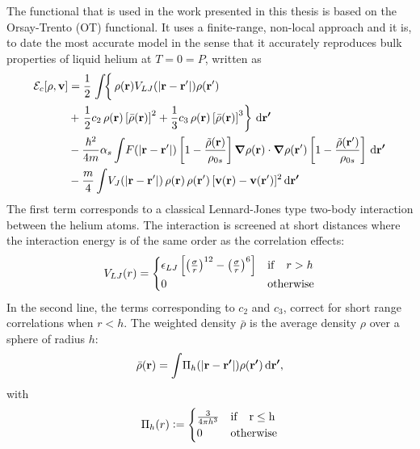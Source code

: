 		The functional that is used in the work presented in this thesis is based on the Orsay-Trento (OT) functional\citep{Dalfovo1995}. It uses a finite-range, non-local approach and it is, to date the most accurate model in the sense that it accurately reproduces bulk properties of liquid helium at $T=0=P$, written as		
		\begin{align}
			\mathcal{E}_c[\rho ,\bm{\mathrm{v}}] &=  
			\frac{1}{2} \left.\int \! \right\{\rho({\bf r}) V_{LJ}(|{\bf r}-{\bf r'}|) \rho({\bf r'}) \nonumber \\
			&+ \left.\frac{1}{2} c_2\, \rho({\bf r}) \left[{\bar \rho}({\bf r}) \right]^2 
			+ \frac{1}{3} c_3 \, \rho({\bf r}) \left[ {\bar \rho}({\bf r}) \right]^3\right\}\,\mathrm{d}{\bm{\mathrm{r'}}} \nonumber \\
			&- \frac{\hbar^2}{4m} \alpha_s \int \! F(|{\bf r}-{\bf r'}|) \left[ 1- \frac{{\tilde \rho}({\bf r})}{\rho_{0s}} \right]\grad{\rho({\bf r})} \cdot \grad{\rho({\bf r'})} \left[ 1- \frac{{\tilde \rho}({\bf r'})}{\rho_{0s}} \right]\,\mathrm{d}{\bm{\mathrm{r'}}} \nonumber \\
			& - \frac{m}{4} \int \! V_J(| \mathbf{r} - \mathbf{r}'|)\, \rho(\mathbf{r}) \, \rho(\mathbf{r}')\,  [\mathbf{v}(\mathbf{r})-\mathbf{v}(\mathbf{r}')]^2\,\mathrm{d}{\bm{\mathrm{r'}}} \label{eq:otf}
		\end{align}
		The first term corresponds to a classical Lennard-Jones type two-body interaction between the helium atoms. The interaction is screened at short distances where the interaction energy is of the same order as the correlation effects:
		\begin{align}
			V_{LJ}(r) = \begin{cases}
			\epsilon_{LJ} \left[\left(\frac{\sigma}{r} \right)^{12} - \left(\frac{\sigma}{r} \right)^{6} \right] & {\rm if} \quad r > h \\
			0 & {\rm otherwise}
			\end{cases}\label{eq9}
		\end{align}
		In the second line, the terms corresponding to $c_2$ and $c_3$, correct for short range correlations when $r<h$. The weighted density $\bar{\rho}$ is the average density $\rho$ over a sphere of radius $h$:
		\begin{align}
			\bar{\rho}(\bm{\mathrm{r}}) = \int\!\Pi_h\qty(\abs{\bm{\mathrm{r}}-\bm{\mathrm{r'}}})\rho({\bm{\mathrm{r'}}})\,\mathrm{d}{\bm{\mathrm{r'}}},
		\end{align}
		with
		\begin{align}
			\Pi_h(r) \vcentcolon= \begin{cases}
				\frac{3}{4\pi h^3} & \rm{if} \quad r\leq h \\
				0 & \rm{otherwise}
			\end{cases}
		\end{align}
